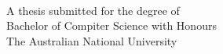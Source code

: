 
\begin{titlepage}
  \enlargethispage{2cm}
  \begin{center}
    \makeatletter
    \Huge\textbf{\@title} \\[.4cm]
    \Huge\textbf{\thesisqualifier} \\[2.5cm]
    \huge\textbf{\@author} \\[9cm]
    \makeatother
    \LARGE A thesis submitted for the degree of \\
    Bachelor of Compiter Science with Honours \\
    The Australian National University \\[2cm]
    \thismonth
  \end{center}
\end{titlepage}
